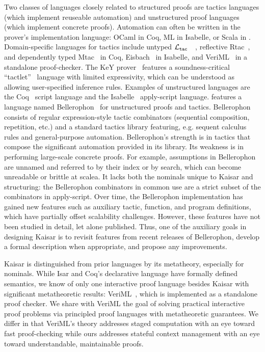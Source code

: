 \documentclass[12pt]{cmuthesis}
\theoremstyle{definition}
\theoremstyle{remark}
\newcommand{\ltac}{\ensuremath{\mathcal{L}_{\tt tac}}~}
\begin{document}
Two classes of languages closely related to structured proofs are tactics languages (which implement reuseable automation) and unstructured proof languages (which implement concrete proofs).
Automation can often be written in the prover's implementation language: OCaml in Coq, ML in Isabelle, or Scala in \KeYmaeraX.
Domain-specific languages for tactics include untyped \ltac~\cite{Delahaye:2000:TLS:1765236.1765246}, reflective Rtac~\cite{malecha2015rtac-coqpl}, and dependently typed Mtac~\cite{Ziliani:2013:MMT:2544174.2500579} in Coq, Eisbach~\cite{Matichuk:2016:EPM:2904234.2904264} in Isabelle, and VeriML~\cite{DBLP:conf/icfp/StampoulisS10,DBLP:conf/popl/StampoulisS12} in a standalone proof-checker.
The KeY prover~\cite{DBLP:series/lncs/10001} features a soundness-critical ``tactlet''~\cite{habermalz2000interactiv} language with limited expressivity, which can be understood as allowing user-specified inference rules.
Examples of unstructured languages are the Coq~\cite{COQ} script language and the Isabelle~\cite{DBLP:books/sp/NipkowPW02} apply-script language.
\KeYmaeraX features a language named Bellerophon~\cite{DBLP:conf/itp/FultonMBP17} for unstructured proofs and tactics.
Bellerophon consists of regular expression-style tactic combinators (sequential composition, repetition, etc.) and a standard tactics library featuring, e.g. sequent calculus rules and general-purpose automation.
Bellerophon's strength is in tactics that compose the significant automation provided in its library.
Its weakness is in performing large-scale concrete proofs.
For example, assumptions in Bellerophon are unnamed and referred to by their index or by search, which can become unreadable or brittle at scalea.
It lacks both the nominals unique to Kaisar and structuring: the Bellerophon combinators in common use are a strict subset of the combinators in apply-script.
Over time, the Bellerophon implementation has gained new features such as auxiliary tactic, function, and program definitions, which have partially offset scalability challenges.
However, these features have not been studied in detail, let alone published.
Thus, one of the auxiliary goals in designing Kaisar is to revisit features from recent releases of Bellerophon, develop a formal description when appropriate, and propose any improvements.


Kaisar is distinguished from prior languages by its metatheory, especially for nominals.
While Isar and Coq's declarative language have formally defined semantics, we know of only one interactive proof language besides Kaisar with significant metatheoretic results:  VeriML~\cite{DBLP:conf/icfp/StampoulisS10,DBLP:conf/popl/StampoulisS12}, which is implemented as a standalone proof checker.
We share with VeriML the goal of solving practical interactive proof problems via principled proof languages with metatheoretic guarantees.
We differ in that VeriML's theory addresses staged computation with an eye toward fast proof-checking  while ours addresses stateful context management with an eye toward understandable, maintainable proofs.
\end{document}
